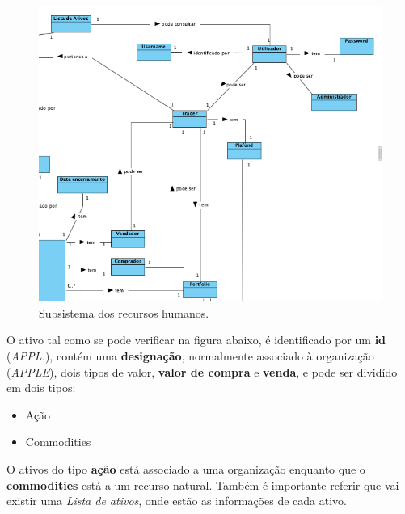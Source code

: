 \documentclass[11pt,a4paper]{report}%
\begin{document}
\begin{figure}[H]
	\centering
	\includegraphics[scale=0.6]{modelo-dominio-1.png}
	\caption{Subsistema dos recursos humanos. }
	\label{img:pag}
\end{figure}

\newpage

O ativo tal como se pode verificar na figura abaixo, é identificado por um \textbf{id} (\emph{APPL.}), contém uma \textbf{designação}, normalmente associado à organização (\emph{APPLE}), dois tipos de valor, \textbf{valor de compra} e \textbf{venda}, e pode ser dividído em dois tipos:

\begin{itemize}
    \item Ação
    \item Commodities
\end{itemize}{}

O ativos do tipo \textbf{ação} está associado a uma organização enquanto que o \textbf{commodities} está a um recurso natural. Também é importante referir que vai existir uma \emph{Lista de ativos}, onde estão as informações de cada ativo.
\end{document}
